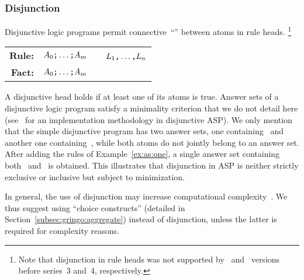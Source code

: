 \subsubsection{Disjunction}\label{subsec:gringo:disjunction}
Disjunctive logic programs permit connective~``\code{;}'' between atoms in rule heads.%
\footnote{Note that disjunction in rule heads was not supported by \clasp\ and \clingo\ versions before series~3 and~4, respectively.}
\par
\medskip
\begin{tabular}{rl@{}l}\label{eq:disjunctive:rule}
\textbf{Rule:} & $A_0\text{\texttt{;}}\dots\text{\texttt{;}}A_m$&~\code{:-}~$L_1\text{\texttt{,}}\dots\text{\texttt{,}}L_n$\code{.}
\\
\textbf{Fact:} & $A_0\text{\texttt{;}}\dots\text{\texttt{;}}A_m$&\code{.}
\end{tabular}
%
%
\par
\medskip
\noindent
A disjunctive head holds if at least one of its atoms is true.
Answer sets of a disjunctive logic program satisfy a minimality criterion
that we do not detail here
(see~\cite{eitpol06a,gekasc11b} for an implementation methodology in disjunctive ASP).
We only mention that the simple disjunctive program  has two answer sets,
one containing~ and another one containing~,
while both atoms do not jointly belong to an answer set.
After adding the rules of Example~\ref{ex:as:one}, a single answer set containing both~ and~ is obtained.
This illustrates that disjunction in ASP is neither strictly exclusive or inclusive but subject to minimization.

In general, the use of disjunction may increase
computational complexity~\cite{eitgot95a}.
We thus suggest using ``choice constructs'' (detailed in Section~\ref{subsec:gringo:aggregate})
instead of disjunction, unless the latter is required for complexity reasons.

